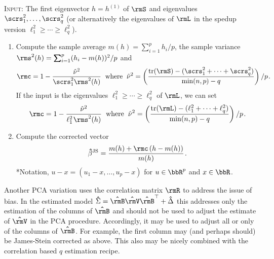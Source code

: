 \documentclass[leqno,12pt]{article}
\begin{document}
{\begin{mdframed}[style=clean]
\textsc{Input:} The first eigenvector $h = h^{(1)}$ of $\rmS$
and eigenvalues 
$\scrs^2_1, \dots, \scrs^2_q$
(or alternatively the eigenvalues of $\rmL$ in the
spedup version
$\ell^2_1 \ge \cdots \ge \ell^2_q$).
\begin{enumerate}
\item Compute the sample average
$m(h) = \sum_{i=1}^p h_i/p$, the sample variance 
$\rms^2 (h) = \sum_{i=1}^p (h_i-m(h))^2/p$
and 
\begin{align*} 
 \rmc = 1 - \frac{\hat{\nu}^2}{\scrs_1^2 \rms^2 (h)} 
\hspace{0.08in} \text{where} \hspace{0.08in}
\hat{\nu}^2   =
\bigg( \frac{\tr(\rmS)-
(\scrs^2_1+\cdots +\scrs^2_q)}{\min(n,p)-q} \bigg) 
 \s[2]/ p \s .
\end{align*}
If the input is the eigenvalues 
$\ell^2_1 \ge \cdots \ge \ell^2_q$
of $\rmL$, we can set 
\begin{align*} 
 \rmc = 1 - \frac{\hat{\nu}^2}{\ell_1^2 \s \rms^2 (h)} 
\hspace{0.08in} \text{where} \hspace{0.08in}
\hat{\nu}^2   =
\bigg( \frac{\tr(\rmL)-
(\ell^2_1+\cdots +\ell^2_q)}{\min(n,p)-q} \bigg) 
 \s[2]/ p \s .
\end{align*}
\item Compute the corrected vector 
\begin{align*} 
 \bhat{\beta}^{\textup{JS}} = 
 \frac{m(h) + \rmc\s[1.5] (h - m(h))}
 { m(h)}  \s .
\end{align*}
*Notation, $u - x = (u_1-x,\dots, u_p-x)$
for $u \in \bbR^p$ and $x \in \bbR$.
\end{enumerate}
\end{mdframed}

Another PCA variation uses the correlation matrix 
$\rmR$ to address
the issue of bias. In the estimated model $\hcov
= \bhat{\rmB}\bhat{\rmV} \bhat{\rmB}^\top + \bhat{\Delta}$
this addresses only the estimation of the columns 
of $\bhat{\rmB}$ and should not be used to adjust the 
estimate of $\bhat{\rmV}$ in the PCA procedure. Accordingly,
it may be used to adjust all or only of the columns
of $\bhat{\rmB}$. For example, the first column may
(and perhaps should) be
James-Stein corrected as above. This also may be nicely
combined with the correlation based $q$ estimation recipe.

}
\end{document}
